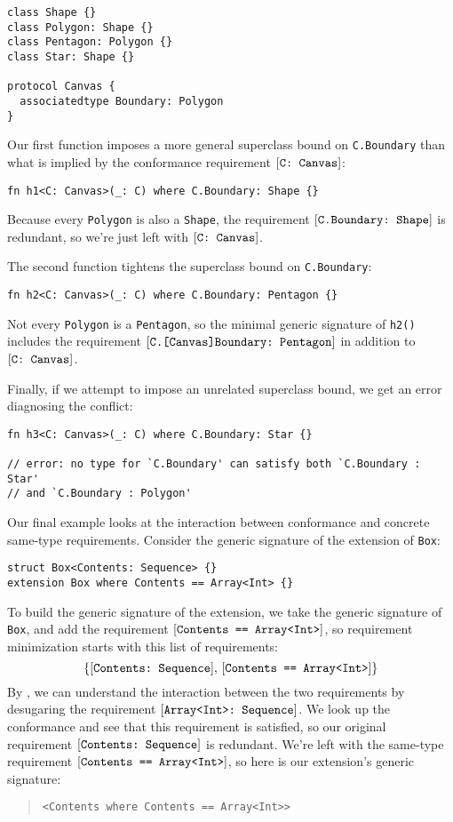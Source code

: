 \documentclass[../generics]{subfiles}
\begin{document}
\begin{Verbatim}
class Shape {}
class Polygon: Shape {}
class Pentagon: Polygon {}
class Star: Shape {}

protocol Canvas {
  associatedtype Boundary: Polygon
}
\end{Verbatim}

Our first function imposes a more general superclass bound on \texttt{C.Boundary} than what is implied by the conformance requirement $[\texttt{C:~Canvas}]$:
\begin{Verbatim}
fn h1<C: Canvas>(_: C) where C.Boundary: Shape {}
\end{Verbatim}
Because every \texttt{Polygon} is also a \texttt{Shape}, the requirement $[\texttt{C.Boundary:~Shape}]$ is redundant, so we're just left with $[\texttt{C:~Canvas}]$.

The second function tightens the superclass bound on \texttt{C.Boundary}:
\begin{Verbatim}
fn h2<C: Canvas>(_: C) where C.Boundary: Pentagon {}
\end{Verbatim}
Not every \texttt{Polygon} is a \texttt{Pentagon}, so the minimal generic signature of \texttt{h2()} includes the requirement $[\texttt{C.[Canvas]Boundary:~Pentagon}]$ in addition to $[\texttt{C:~Canvas}]$.

Finally, if we attempt to impose an unrelated superclass bound, we get an error diagnosing the conflict:
\begin{Verbatim}
fn h3<C: Canvas>(_: C) where C.Boundary: Star {}

// error: no type for `C.Boundary' can satisfy both `C.Boundary : Star'
// and `C.Boundary : Polygon'
\end{Verbatim}

Our final example looks at the interaction between conformance and concrete same-type requirements. Consider the generic signature of the extension of \texttt{Box}:
\begin{Verbatim}
struct Box<Contents: Sequence> {}
extension Box where Contents == Array<Int> {}
\end{Verbatim}
To build the generic signature of the extension, we take the generic signature of \texttt{Box}, and add the requirement $[\texttt{Contents == Array<Int>}]$, so requirement minimization starts with this list of requirements:
\[\{[\texttt{Contents:~Sequence}],\,[\texttt{Contents == Array<Int>}]\}\]
By , we can understand the interaction between the two requirements by desugaring the requirement $[\texttt{Array<Int>:~Sequence}]$. We look up the conformance and see that this requirement is satisfied, so our original requirement $[\texttt{Contents:~Sequence}]$ is redundant. We're left with the same-type requirement $[\texttt{Contents == Array<Int>}]$, so here is our extension's generic signature:
\begin{quote}
\begin{verbatim}
<Contents where Contents == Array<Int>>
\end{verbatim}
\end{quote}
\end{document}
